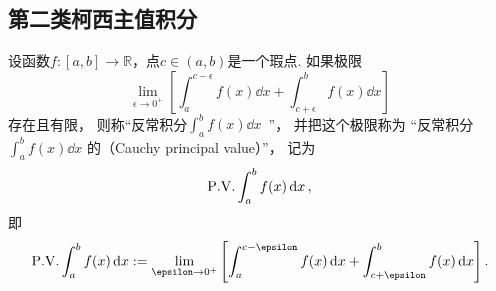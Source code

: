 \subsection{第二类柯西主值积分}
\begin{definition}
设函数\(f\colon[a,b]\to\mathbb{R}\)，点\(c\in(a,b)\)是一个瑕点.
如果极限\begin{equation*}
	\lim_{\epsilon\to0^+} \left[
		\int_a^{c-\epsilon} f(x) \dd{x}
		+ \int_{c+\epsilon}^b f(x) \dd{x}
	\right]
\end{equation*}存在且有限，
则称“反常积分\(\int_a^b f(x) \dd{x}\)~”，
并把这个极限称为
“反常积分\(\int_a^b f(x) \dd{x}\)
的（Cauchy principal value）”，
记为\begin{equation*}
	\pvint_a^b f(x) \dd{x},
\end{equation*}
即\begin{equation*}
	\pvint_a^b f(x) \dd{x}
	\defeq \lim_{\epsilon\to0^+} \left[
		\int_a^{c-\epsilon} f(x) \dd{x}
		+ \int_{c+\epsilon}^b f(x) \dd{x}
	\right].
\end{equation*}
\end{definition}

